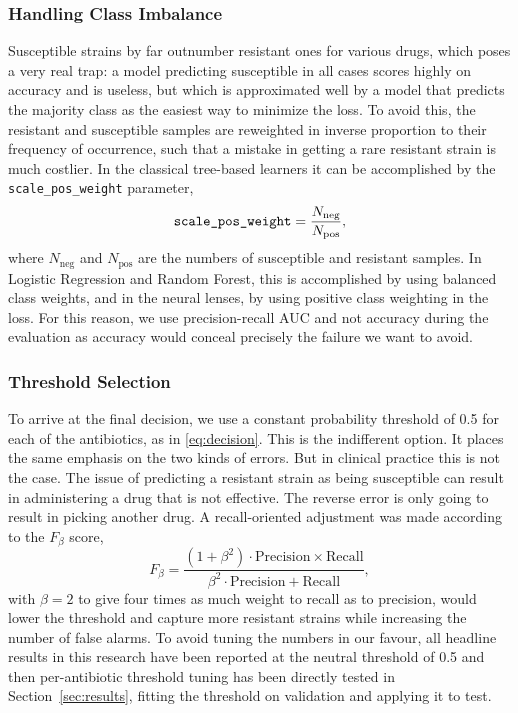 \documentclass[journal]{IEEEtran}
\begin{document}
\subsubsection{Handling Class Imbalance}
Susceptible strains by far outnumber resistant ones for various drugs, which poses a
very real trap: a model predicting susceptible in all cases scores highly on accuracy
and is useless, but which is approximated well by a model that predicts the majority
class as the easiest way to minimize the loss. To avoid this, the resistant and
susceptible samples are reweighted in inverse proportion to their frequency of
occurrence, such that a mistake in getting a rare resistant strain is much costlier.
In the classical tree-based learners it can be accomplished by the
\texttt{scale\_pos\_weight} parameter,
\begin{equation}
\text{\texttt{scale\_pos\_weight}} = \frac{N_{\text{neg}}}{N_{\text{pos}}},
\label{eq:scale_pos_weight}
\end{equation}
where $N_{\text{neg}}$ and $N_{\text{pos}}$ are the numbers of susceptible and
resistant samples. In Logistic Regression and Random Forest, this is accomplished by
using balanced class weights, and in the neural lenses, by using positive class
weighting in the loss. For this reason, we use precision-recall AUC and not accuracy
during the evaluation as accuracy would conceal precisely the failure we want to
avoid.

\subsubsection{Threshold Selection}
\label{subsec:threshold_selection}
To arrive at the final decision, we use a constant probability threshold of 0.5 for
each of the antibiotics, as in \eqref{eq:decision}. This is the indifferent
option. It places the same emphasis on the two kinds of errors. But in clinical
practice this is not the case. The issue of predicting a resistant strain as being
susceptible can result in administering a drug that is not effective. The reverse
error is only going to result in picking another drug. A recall-oriented adjustment
was made according to the $F_{\beta}$ score,
\begin{equation}
F_{\beta} = \frac{(1 + \beta^2)\cdot\text{Precision}\times\text{Recall}}{\beta^2\cdot\text{Precision} + \text{Recall}},
\label{eq:fbeta}
\end{equation}
with $\beta = 2$ to give four times as much weight to recall as to precision, would
lower the threshold and capture more resistant strains while increasing the number of
false alarms. To avoid tuning the numbers in our favour, all headline results in this
research have been reported at the neutral threshold of 0.5 and then per-antibiotic
threshold tuning has been directly tested in Section~\ref{sec:results}, fitting the
threshold on validation and applying it to test.
\end{document}
